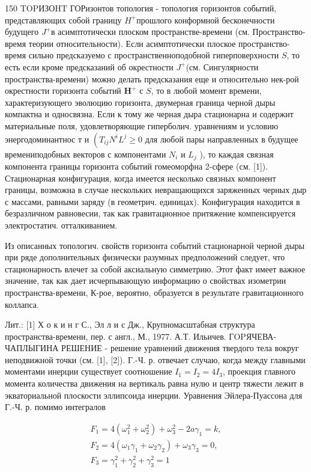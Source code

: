 \documentclass[10pt]{article}
\begin{document}
150 TOPИЗОHT ГОРизонтов топология - топология горизонтов событий, представляющих собой границу $H^{+}$прошлого конформной бесконечности будущего $J^{+}$в асимптотически плоском пространстве-времени (см. Пространство-время теории относительности). Если асимптотически плоское пространство-время сильно предсказуемо с пространственноподобной гиперповерхности $S$, то есть если кроме предсказаний об окрестности $J^{+}$(см. Сингулярности пространства-времени) можно делать предсказания еще и относительно нек-рой окрестности горизонта событий $\boldsymbol{H}^{+}$ с $S$, то в любой момент времени, характеризующего эволюцию горизонта, двумерная граница черной дыры компактна и односвязна. Если к тому же черная дыра стационарна и содержит материальные поля, удовлетворяющие гиперболич. уравнениям и условию энергодоминантнос т и $\left(T_{i j} N^{i} L^{j} \geqslant 0\right.$ для любой пары направленных в будущее времениподобных векторов с компонентами $N_{i}$ и $L_{j}$ ), то каждая связная компонента границы горизонта событий гомеоморфна 2-сфере (см. [1]). Стационарная конфигурация, когда имеется несколько связных компонент границы, возможна в случае нескольких невращающихся заряженных черных дыр с массами, равными заряду (в геометрич. единицах). Конфигурация находится в безразличном равновесии, так как гравитационное притяжение компенсируется электростатич. отталкиванием.



Из описанных топологич. свойств горизонта событий стационарной черной дыры при ряде дополнительных физически разумных предположений следует, что стационарность влечет за собой аксиальную симметрию. Этот факт имеет важное значение, так как дает исчерпывающую информацию о свойствах изометрии пространства-времени, К-рое, вероятно, образуется в результате гравитационного коллапса.



Лит.: [1] Х о к и н г С., Эл л и с Дж., Крупномасштабная структура пространства-времени, пер. с англ., М., 1977. А.Т. Ильичев. ГOPЯЧЕВА-ЧАПЛЫГИНА РЕШЕНИЕ - решение уравнений движения твердого тела вокруг неподвижной точки (см. [1], [2]). Г.-Ч. р. отвечает случаю, когда между главными моментами инерции существует соотношение $I_{1}=I_{2}=4 I_{3}$, проекция главного момента количества движения на вертикаль равна нулю и центр тяжести лежит в экваториальной плоскости эллипсоида инерции. Уравнения Эйлера-Пуассона для Г.-Ч. р. помимо интегралов



\[

\begin{gathered}

F_{1}=4\left(\omega_{1}^{2}+\omega_{2}^{2}\right)+\omega_{3}^{2}-2 a \gamma_{1}=k, \\

F_{2}=4\left(\omega_{1} \gamma_{1}+\omega_{2} \gamma_{2}\right)+\omega_{3} \gamma_{3}=0, \\

F_{3}=\gamma_{1}^{2}+\gamma_{2}^{2}+\gamma_{3}^{2}=1

\end{gathered}

\]
\end{document}
